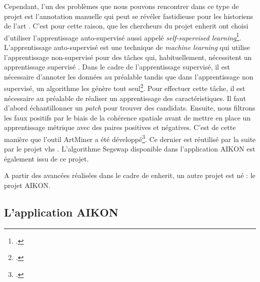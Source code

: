Cependant, l'un des problèmes que nous pouvons rencontrer dans ce type de projet est l'annotation manuelle qui peut se révéler fastidieuse pour les historiens de l'art . C'est pour cette raison, que les chercheurs du projet \gls{enherit} ont choisi d'utiliser l'apprentissage auto-supervisé aussi appelé \textit{self-supervised learning}\footcite{shenDiscoveringVisualPatterns2019}.
L'apprentissage auto-supervisé est \og une technique de \textit{machine learning} qui utilise l'apprentissage non-supervisé pour des tâches qui, habituellement, nécessitent un apprentissage supervisé \fg. Dans le cadre de l'apprentissage supervisé, il est nécessaire d'annoter les données au préalable tandis que dans l'apprentissage non supervisé, un algorithme les génère tout seul\footcite{QuestceQueLapprentissage2023}.
Pour effectuer cette tâche, il est nécessaire au préalable de réaliser un apprentissage des caractéristiques. Il faut d'abord échantillonner un \textit{patch} pour trouver des candidats. Ensuite, nous filtrons les faux positifs par le biais de la cohérence spatiale avant de mettre en place un apprentissage métrique avec des paires positives et négatives. C'est de cette manière que l'outil ArtMiner a été développé\footcite{ArtMiner}. Ce dernier est réutilisé par la suite par le projet \gls{vhs} . 
L'algorithme Segswap disponible dans l'application AIKON est également issu de ce projet. 

A partir des avancées réalisées dans le cadre de \gls{enherit}, un autre projet est né : le projet AIKON. 


\subsection{L'application AIKON}

